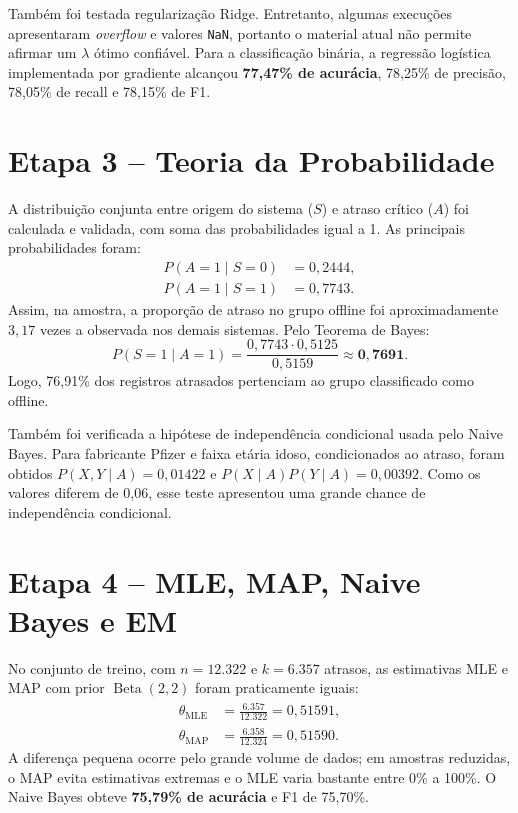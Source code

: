 \documentclass[12pt]{article}
\begin{document}
Também foi testada regularização Ridge. Entretanto, algumas execuções apresentaram \textit{overflow} e valores \texttt{NaN}, portanto o material atual não permite afirmar um $\lambda$ ótimo confiável. Para a classificação binária, a regressão logística implementada por gradiente alcançou \textbf{77,47\% de acurácia}, 78,25\% de precisão, 78,05\% de recall e 78,15\% de F1.

\section{Etapa 3 -- Teoria da Probabilidade}

A distribuição conjunta entre origem do sistema ($S$) e atraso crítico ($A$) foi calculada e validada, com soma das probabilidades igual a 1. As principais probabilidades foram:
\begin{align}
P(A=1\mid S=0)&=0,2444,\\
P(A=1\mid S=1)&=0,7743.
\end{align}
Assim, na amostra, a proporção de atraso no grupo offline foi aproximadamente $3,17$ vezes a observada nos demais sistemas. Pelo Teorema de Bayes:
\begin{equation}
P(S=1\mid A=1)=\frac{0,7743\cdot0,5125}{0,5159}\approx\mathbf{0,7691}.
\end{equation}
Logo, 76,91\% dos registros atrasados pertenciam ao grupo classificado como offline.

Também foi verificada a hipótese de independência condicional usada pelo Naive Bayes. Para fabricante Pfizer e faixa etária idoso, condicionados ao atraso, foram obtidos $P(X,Y\mid A)=0,01422$ e $P(X\mid A)P(Y\mid A)=0,00392$. Como os valores diferem de 0,06, esse teste apresentou uma grande chance de independência condicional.

\section{Etapa 4 -- MLE, MAP, Naive Bayes e EM}

No conjunto de treino, com $n=12.322$ e $k=6.357$ atrasos, as estimativas MLE e MAP com prior $\operatorname{Beta}(2,2)$ foram praticamente iguais:
\begin{align}
\hat\theta_{\mathrm{MLE}}&=\frac{6.357}{12.322}=0,51591,\\
\hat\theta_{\mathrm{MAP}}&=\frac{6.358}{12.324}=0,51590.
\end{align}
A diferença pequena ocorre pelo grande volume de dados; em amostras reduzidas, o MAP evita estimativas extremas e o MLE varia bastante entre 0\% a 100\%. O Naive Bayes obteve \textbf{75,79\% de acurácia} e F1 de 75,70\%.
\end{document}
